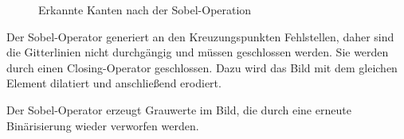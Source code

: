 \begin{figure}[h!]
    \hfill
    \caption{Erkannte Kanten nach der Sobel-Operation}
\end{figure}

Der Sobel-Operator generiert an den Kreuzungspunkten Fehlstellen, daher sind die Gitterlinien nicht durchgängig und müssen geschlossen werden.
Sie werden durch einen Closing-Operator geschlossen.
Dazu wird das Bild mit dem gleichen Element dilatiert und anschließend erodiert.

Der Sobel-Operator erzeugt Grauwerte im Bild, die durch eine erneute Binärisierung wieder verworfen werden.

